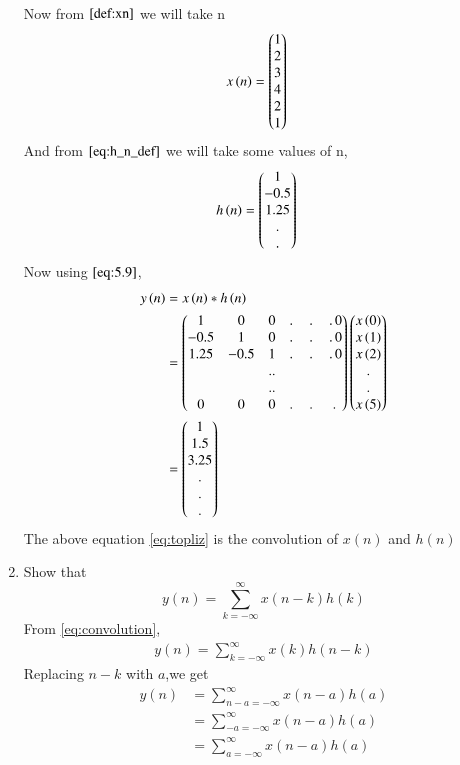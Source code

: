 \documentclass[journal,12pt,twocolumn]{IEEEtran}
\renewcommand\thesection{\arabic{section}}
\begin{document}
\begin{enumerate}[label=\thesection.\arabic*]
\begin{align}
	\end{align}
	Now from $\eqref{def:xn}$ we will take n 
	\begin{align}
		x\left(n\right) &= \begin{pmatrix}1\\2\\3\\4\\2\\1\end{pmatrix}
	\end{align}
	And from $\eqref{eq:h_n_def}$ we will take some values of n,
	\begin{align} 
		h\left(n\right) &= \begin{pmatrix}1 \\ -0.5 \\ 1.25 \\. \\ . \end{pmatrix}
	\end{align}
	Now using $\eqref{eq:5.9}$,
	\begin{align}
		y\left(n\right) &= x\left(n\right)*h\left(n\right)\\
		&= \begin{pmatrix}1 & 0 & 0 &.\,&.\,&.\,0 \\
			-0.5 & 1 & 0 & .\,&.\,&.\,0 \\
			1.25 & -0.5 & 1 & .\,&.\,&.\,0 \\
			&&..\\&&..\\ 0 & 0 &  0 &.\,&.\,&.\, \end{pmatrix}\begin{pmatrix}x\left(0\right)\\x\left(1\right)\\x\left(2\right)\\ . \\.\\x\left(5\right)\end{pmatrix} \\
		&= \begin{pmatrix}1\\1.5\\3.25\\.\\.\\.\end{pmatrix}
		\label{eq:topliz}
	\end{align}
The above equation \eqref{eq:topliz} is the convolution of $x(n)$ and $h(n)$
	
	
	
\item Show that
	\begin{equation}
		y(n) =  \sum_{k=-\infty}^{\infty}x(n-k)h(k)
	\end{equation}
\solution From \eqref{eq:convolution}, 
	\begin{align}
		y(n) = \sum_{k=-\infty}^{\infty}x(k)h(n-k)
	\end{align}
	Replacing $n-k$ with $a$,we get
	\begin{align}
		y(n) &= \sum_{n-a=-\infty}^{\infty}x(n-a)h(a)\\
		&=\sum_{-a=-\infty}^{\infty}x(n-a)h(a)\\
		&=\sum_{a=-\infty}^{\infty}x(n-a)h(a)
	\end{align}
\end{enumerate}
%
\end{document}
